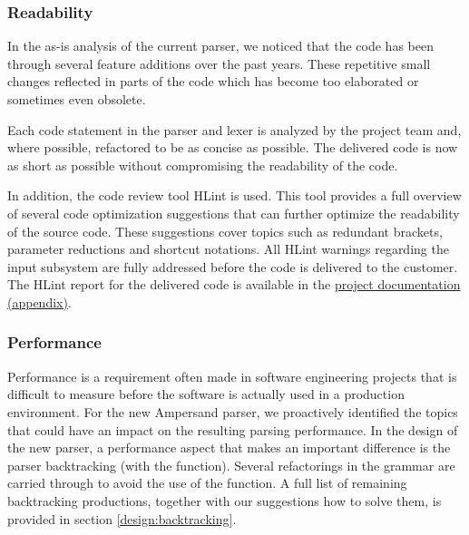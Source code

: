 \subsubsection{Readability}
  In the as-is analysis of the current parser, we noticed that the code has been through several feature additions over the past years.
  These repetitive small changes reflected in parts of the code which has become too elaborated or sometimes even obsolete.

  Each code statement in the parser and lexer is analyzed by the project team and, where possible, refactored to be as concise as possible.
  The delivered code is now as short as possible without compromising the readability of the code.

  In addition, the code review tool HLint is used.
  This tool provides a full overview of several code optimization suggestions that can further optimize the readability of the source code. 
  These suggestions cover topics such as redundant brackets, parameter reductions and shortcut notations.
  All HLint warnings regarding the input subsystem are fully addressed before the code is delivered to the customer.
  The HLint report for the delivered code is available in the \hyperref[app:docs]{project documentation (appendix)}.

\subsubsection{Performance}
  Performance is a requirement often made in software engineering projects that is difficult to measure before the software is actually used in a production environment.
  For the new Ampersand parser, we proactively identified the topics that could have an impact on the resulting parsing performance.
  In the design of the new parser, a performance aspect that makes an important difference is the parser backtracking (with the  function).
  Several refactorings in the grammar are carried through to avoid the use of the  function. 
  A full list of remaining backtracking productions, together with our suggestions how to solve them, is provided in section \autoref{design:backtracking}.
